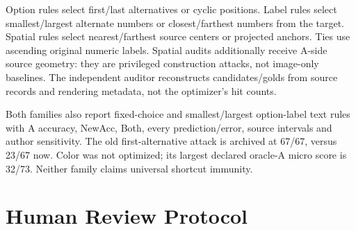 \documentclass[10pt,twocolumn,letterpaper]{article}
\begin{document}
\begin{table}[H]
\centering\small
\caption{Transition counts: rows are A gold, columns B gold.
Left: frozen Color (73). Right: optimized Part-type (67).}
\label{tab:transitions}
\hspace{12pt}

\end{table}

\begin{table}[H]
\centering\small
\caption{All 13 declared Part-type oracle-A attacks, B accuracy (\%).
A is supplied correctly, so NewAcc=Both. Each rule excludes the
A-matching candidate and never reads B. Source intervals are descriptive
after design optimization, not out-of-sample guarantees.}
\label{tab:shortcuts}
\setlength{\tabcolsep}{3pt}

\end{table}

Option rules select first/last alternatives or cyclic positions.
Label rules select smallest/largest alternate numbers or closest/farthest
numbers from the target. Spatial rules select nearest/farthest source
centers or projected anchors. Ties use ascending original numeric labels.
Spatial audits additionally receive A-side source geometry:
they are privileged construction attacks, not image-only baselines.
The independent auditor reconstructs candidates/golds from source
records and rendering metadata, not the optimizer's hit counts.

Both families also report fixed-choice and smallest/largest option-label
text rules with A accuracy, NewAcc, Both, every prediction/error,
source intervals and author sensitivity. The old first-alternative attack
is archived at 67/67, versus 23/67 now. Color was not optimized; its
largest declared oracle-A micro score is 32/73. Neither family claims
universal shortcut immunity.

\begin{table}[!t]
\centering\small
\caption{All source assemblies. Band is source scale. Color and
Part-type count primary parents, each contributing exactly one A/B
pair. All 24 sources appear in both visual families; variants do not
increase source count.}
\label{tab:sources}

\end{table}

\section{Human Review Protocol}
\end{document}

